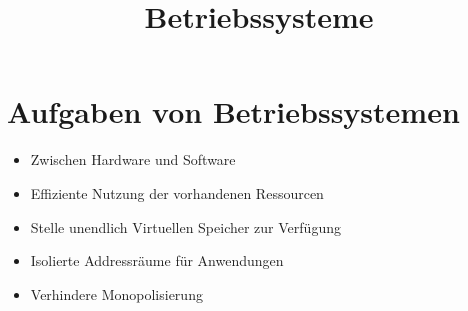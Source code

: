 \documentclass[a4paper]{article}
\begin{document}
\title{Betriebssysteme}
\maketitle
\section{Aufgaben von Betriebssystemen}
\begin{itemize}
\item Zwischen Hardware und Software
\item Effiziente Nutzung der vorhandenen Ressourcen
\item Stelle unendlich Virtuellen Speicher zur Verfügung
\item Isolierte Addressräume für Anwendungen
\item Verhindere Monopolisierung
\end{itemize}
\end{document}
